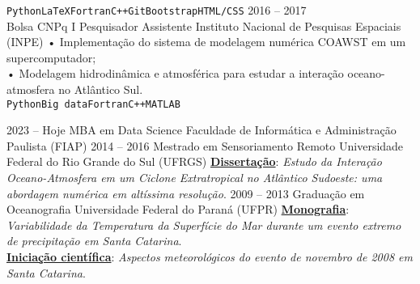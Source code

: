 \documentclass[9pt]{developercv} %
\begin{document}
\begin{entrylist}
{		\texttt{Python}\slashsep\texttt{LaTeX}\slashsep\texttt{Fortran}\slashsep\texttt{C++}\slashsep\texttt{Git}\slashsep\texttt{Bootstrap}\slashsep\texttt{HTML/CSS}}
	\entry
		{2016 -- 2017\\\footnotesize{Bolsa CNPq I}}
		{Pesquisador Assistente}
		{Instituto Nacional de Pesquisas Espaciais (INPE)}
		{•  Implementação do sistema de modelagem numérica COAWST em um supercomputador; \\
		 • Modelagem hidrodinâmica e atmosférica para estudar a interação oceano-atmosfera no Atlântico Sul. 
		 \\ \texttt{Python}\slashsep\texttt{Big data}\slashsep\texttt{Fortran}\slashsep\texttt{C++}\slashsep\texttt{MATLAB}}
\end{entrylist}

\vspace{-0.5cm}

\begin{entrylist}
	\entry
		{2023 -- Hoje}
		{MBA em Data Science}
		{Faculdade de Informática e Administração Paulista (FIAP)}
		{}
		\entry
		{2014 -- 2016}
		{Mestrado em Sensoriamento Remoto}
		{Universidade Federal do Rio Grande do Sul (UFRGS)}
		{\href{https://lume.ufrgs.br/handle/10183/171223}{\textcolor{bleu_cite}{\textbf{Dissertação}}}: \textit{Estudo da Interação Oceano-Atmosfera em um Ciclone Extratropical no Atlântico Sudoeste: uma abordagem numérica em altíssima resolução}.}
	\entry
		{2009 -- 2013}
		{Graduação em Oceanografia}
		{Universidade Federal do Paraná (UFPR)}
		{\href{http://doi.org/10.13140/RG.2.2.15184.35847}{\textcolor{bleu_cite}{\textbf{Monografia}}}: \textit{Variabilidade da Temperatura da Superfície do Mar durante um evento extremo de precipitação em Santa Catarina}. 
		\\ \href{http://doi.org/10.13140/RG.2.2.25250.68800}{\textcolor{bleu_cite}{\textbf{Iniciação científica}}}: \textit{Aspectos meteorológicos do evento de novembro de 2008 em Santa Catarina}.
		}
\end{entrylist}

\vspace{-0.4cm}
\end{document}

